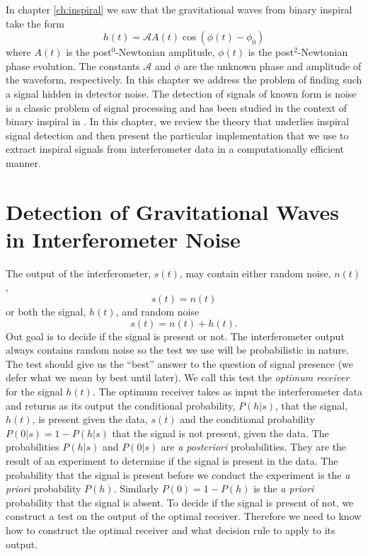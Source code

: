 
In chapter \ref{ch:inspiral} we saw that the gravitational waves from binary
inspiral take the form
\begin{equation}
h(t) = \mathcal{A} A(t) \cos\left( \phi(t) - \phi_0 \right)
\end{equation}
where $A(t)$ is the post$^{0}$-Newtonian amplitude, $\phi(t)$ is the
post$^2$-Newtonian phase evolution. The constants $\mathcal{A}$ and $\phi$ are
the unknown phase and amplitude of the waveform, respectively. In this chapter
we address the problem of finding such a signal hidden in detector noise. The
detection of signals of known form is noise is a classic problem of signal
processing\cite{wainstein:1962} and has been studied in the context of binary
inspiral in \cite{Finn:1992wt,Finn:1992xs}. In this chapter, we review the
theory that underlies inspiral signal detection and then present the particular
implementation that we use to extract inspiral signals from interferometer
data in a computationally efficient manner.

\section{Detection of Gravitational Waves in Interferometer Noise}
\label{s:detectiontheory}

The output of the interferometer, $s(t)$, may contain either random noise,
$n(t)$,
\begin{equation}
s(t) = n(t)
\end{equation}
or both the signal, $h(t)$, and random noise
\begin{equation}
s(t) = n(t) + h(t).
\end{equation}
Out goal is to decide if the signal is present or not. The interferometer
output always contains random noise so the test we use will be probabilistic in
nature. The test should give us the ``best'' answer to the question of signal
presence (we defer what we mean by best until later). We call this test the
\emph{optimum receiver} for the signal $h(t)$. The optimum receiver takes as
input the interferometer data and returns as its output the conditional
probability, $P(h|s)$, that the signal, $h(t)$, is present given the data,
$s(t)$ and the conditional probability $P(0|s) = 1 - P(h|s)$ that the signal
is not present, given the data. The probabilities $P(h|s)$ and $P(0|s)$ are
\emph{a posteriori} probabilities. They are the result of an experiment to
determine if the signal is present in the data. The probability that the
signal is present before we conduct the experiment is the \emph{a priori}
probability $P(h)$. Similarly $P(0) = 1 - P(h)$ is the \emph{a priori}
probability that the signal is absent. To decide if the signal is present of
not, we construct a test on the output of the optimal receiver. Therefore we
need to know how to construct the optimal receiver and what decision rule to
apply to its output.

